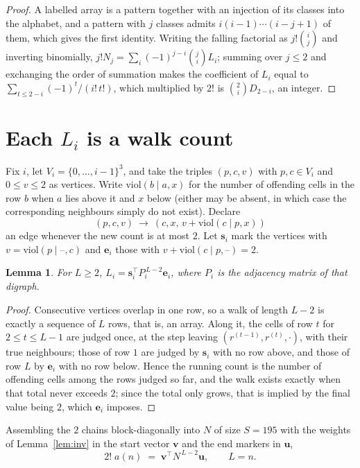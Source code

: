 \documentclass[11pt,a4paper]{article}
\theoremstyle{plain}
\newtheorem{lemma}[theorem]{Lemma}
\theoremstyle{definition}
\begin{document}
\begin{proof}
A labelled array is a pattern together with an injection of its classes into the alphabet,
and a pattern with $j$ classes admits $i(i-1)\cdots(i-j+1)$ of them, which gives the first
identity. Writing the falling factorial as $j!\binom{i}{j}$ and inverting binomially,
$j!N_j=\sum_i(-1)^{j-i}\binom{j}{i}L_i$; summing over $j\le2$ and exchanging the
order of summation makes the coefficient of $L_i$ equal to
$\sum_{t\le2-i}(-1)^t/(i!\,t!)$, which multiplied by $2!$ is
$\binom{2}{i}D_{2-i}$, an integer.
\end{proof}

\section{Each $L_i$ is a walk count}

Fix $i$, let $V_i=\{0,\dots,i-1\}^{3}$, and take the triples $(p,c,v)$ with
$p,c\in V_i$ and $0\le v\le2$ as vertices. Write $\mathrm{viol}(b\mid a,x)$ for the number
of offending cells in the row $b$ when $a$ lies above it and $x$ below (either may be
absent, in which case the corresponding neighbours simply do not exist). Declare
\[
(p,c,v)\ \longrightarrow\ (c,x,\,v+\mathrm{viol}(c\mid p,x))
\]
an edge whenever the new count is at most $2$. Let $\mathbf{s}_i$ mark the vertices with
$v=\mathrm{viol}(p\mid\text{--},c)$ and $\mathbf{e}_i$ those with
$v+\mathrm{viol}(c\mid p,\text{--})=2$.

\begin{lemma}\label{lem:walk}
For $L\ge2$, $L_i=\mathbf{s}_i^{\!\top}P_i^{\,L-2}\mathbf{e}_i$, where $P_i$ is the
adjacency matrix of that digraph.
\end{lemma}

\begin{proof}
Consecutive vertices overlap in one row, so a walk of length $L-2$ is exactly a sequence
of $L$ rows, that is, an array. Along it, the cells of row $t$ for $2\le t\le L-1$ are
judged once, at the step leaving $(r^{(t-1)},r^{(t)},\cdot)$, with their true neighbours;
those of row $1$ are judged by $\mathbf{s}_i$ with no row above, and those of row
$L$ by $\mathbf{e}_i$ with no row below. Hence the running count is the number of
offending cells among the rows judged so far, and the walk exists exactly when that total
never exceeds $2$; since the total only grows, that is implied by the final value being
$2$, which $\mathbf{e}_i$ imposes.
\end{proof}

Assembling the $2$ chains block-diagonally into $N$ of size $S=195$ with the weights of
Lemma~\ref{lem:inv} in the start vector $\mathbf{v}$ and the end markers in
$\mathbf{u}$,
\begin{equation}\label{eq:walk2}
2!\;a(n)\;=\;\mathbf{v}^{\!\top}N^{\,L-2}\mathbf{u},\qquad L=n .
\end{equation}
\end{document}
